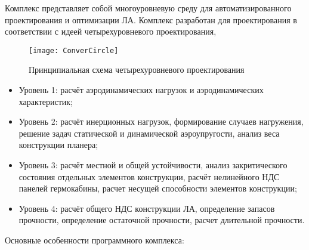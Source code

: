 \label{sec:Conver}


Комплекс представляет собой многоуровневую среду для автоматизированного проектирования и оптимизации ЛА. Комплекс разработан для проектирования в соответствии с идеей четырехуровневого проектирования, 



\begin{figure}[ht]
\centering
\texttt{[image: ConverCircle]} 
\caption{Принципиальная схема четырехуровневого проектирования}
\end{figure}



\begin{itemize}
\item Уровень 1: расчёт аэродинамических нагрузок и аэродинамических характеристик; 
\item Уровень 2: расчёт инерционных нагрузок, формирование случаев нагружения, решение задач статической и динамической аэроупругости, анализ веса конструкции планера;
\item Уровень 3: расчёт местной и общей устойчивости, анализ закритического состояния отдельных элементов конструкции, расчёт нелинейного НДС панелей гермокабины, расчет несущей способности элементов конструкции;
\item Уровень 4: расчёт общего НДС конструкции ЛА, определение запасов прочности, определение остаточной прочности, расчет длительной прочности.
\end{itemize}

Основные особенности программного комплекса:

